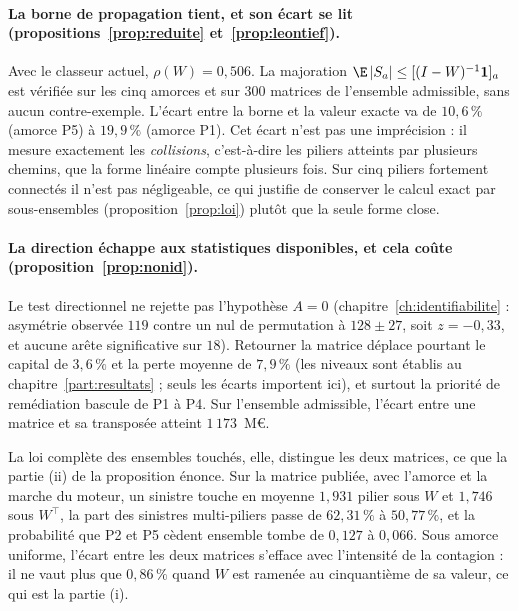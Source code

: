 \paragraph{La borne de propagation tient, et son écart se lit (propositions~\ref{prop:reduite}
et~\ref{prop:leontief}).} Avec le classeur actuel, $\rho(W)=0{,}506$. La majoration
$\E\,|S_a|\le[(I-W)^{-1}\mathbf 1]_a$ est vérifiée sur les cinq amorces et sur $300$ matrices de
l'ensemble admissible, sans aucun contre-exemple. L'écart entre la borne et la valeur exacte va
de $10{,}6\,\%$ (amorce P5) à $19{,}9\,\%$ (amorce P1). Cet écart n'est pas une
imprécision : il mesure exactement les \emph{collisions}, c'est-à-dire les piliers atteints par
plusieurs chemins, que la forme linéaire compte plusieurs fois. Sur cinq piliers fortement
connectés il n'est pas négligeable, ce qui justifie de conserver le calcul exact par
sous-ensembles (proposition~\ref{prop:loi}) plutôt que la seule forme close.

\paragraph{La direction échappe aux statistiques disponibles, et cela coûte
(proposition~\ref{prop:nonid}).} Le test directionnel ne rejette pas l'hypothèse $A=0$
(chapitre~\ref{ch:identifiabilite} : asymétrie observée $119$ contre un nul de permutation à
$128 \pm 27$, soit $z=-0{,}33$, et aucune arête significative sur $18$). Retourner la matrice
déplace pourtant le capital de $3{,}6\,\%$ et la perte moyenne de $7{,}9\,\%$ (les niveaux sont
établis au chapitre~\ref{part:resultats} ; seuls les écarts importent ici), et surtout la priorité
de remédiation bascule de P1 à P4. Sur l'ensemble admissible, l'écart entre une matrice et sa
transposée atteint $1\,173$~M\euro{}.

La loi complète des ensembles touchés, elle, distingue les deux matrices, ce que la partie (ii) de
la proposition énonce. Sur la matrice publiée, avec l'amorce et la marche du moteur, un sinistre
touche en moyenne $1{,}931$ pilier sous $W$ et $1{,}746$ sous $W^\top$, la part des sinistres
multi-piliers passe de $62{,}31\,\%$ à $50{,}77\,\%$, et la probabilité que P2 et P5 cèdent
ensemble tombe de $0{,}127$ à $0{,}066$. Sous amorce uniforme, l'écart entre les deux matrices
s'efface avec l'intensité de la contagion : il ne vaut plus que $0{,}86\,\%$ quand $W$ est ramenée
au cinquantième de sa valeur, ce qui est la partie (i).

